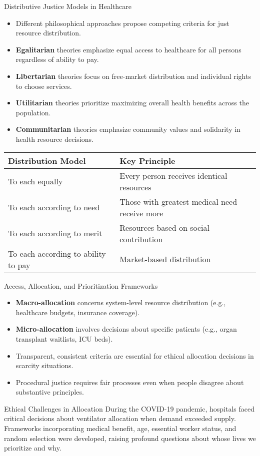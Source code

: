 \documentclass{beamer}
\begin{document}
	\begin{frame}{Distributive Justice Models in Healthcare}
		\begin{itemize}
			\item Different philosophical approaches propose competing criteria for just resource distribution.
			\item \textbf{Egalitarian} theories emphasize equal access to healthcare for all persons regardless of ability to pay.
			\item \textbf{Libertarian} theories focus on free-market distribution and individual rights to choose services.
			\item \textbf{Utilitarian} theories prioritize maximizing overall health benefits across the population.
			\item \textbf{Communitarian} theories emphasize community values and solidarity in health resource decisions.
		\end{itemize}
		
		\begin{table}
			\begin{tabular}{l|l}
				\textbf{Distribution Model} & \textbf{Key Principle} \\
				\hline
				To each equally & Every person receives identical resources \\
				To each according to need & Those with greatest medical need receive more \\
				To each according to merit & Resources based on social contribution \\
				To each according to ability to pay & Market-based distribution \\
			\end{tabular}
		\end{table}
	\end{frame}
	
	\begin{frame}{Access, Allocation, and Prioritization Frameworks}
		\begin{itemize}
			\item \textbf{Macro-allocation} concerns system-level resource distribution (e.g., healthcare budgets, insurance coverage).
			\item \textbf{Micro-allocation} involves decisions about specific patients (e.g., organ transplant waitlists, ICU beds).
			\item Transparent, consistent criteria are essential for ethical allocation decisions in scarcity situations.
			\item Procedural justice requires fair processes even when people disagree about substantive principles.
		\end{itemize}
		
		\begin{alertblock}{Ethical Challenges in Allocation}
			During the COVID-19 pandemic, hospitals faced critical decisions about ventilator allocation when demand exceeded supply. Frameworks incorporating medical benefit, age, essential worker status, and random selection were developed, raising profound questions about whose lives we prioritize and why.
		\end{alertblock}
	\end{frame}
	
\end{document}
